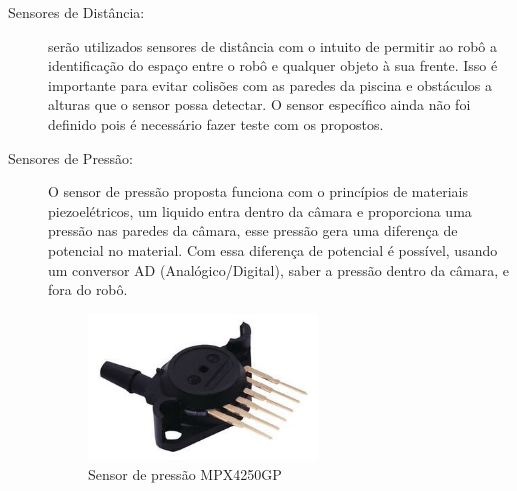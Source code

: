 \begin{description}
\item[Sensores de Distância:] serão utilizados sensores de distância com o
intuito de permitir ao robô a identificação do espaço entre o robô e qualquer
objeto à sua frente. Isso é importante para evitar colisões com as paredes da
piscina e obstáculos a alturas que o sensor possa detectar. O sensor específico
ainda não foi definido pois é necessário fazer teste com os propostos.

\item[Sensores de Pressão:] O sensor de pressão proposta funciona com o
princípios de materiais piezoelétricos, um liquido entra dentro da câmara
e proporciona uma pressão nas paredes da câmara, esse pressão gera uma
diferença de potencial no material. Com essa diferença de potencial é
possível, usando um conversor AD (Analógico/Digital), saber a pressão dentro
da câmara, e fora do robô.
\par
\begin{figure}[h]
  \centering
  \includegraphics[width=0.6\textwidth]{figures/pressure-sensor.png}
  \caption{Sensor de pressão MPX4250GP}
  \label{fig:pressure-sensor}
\end{figure}
\FloatBarrier


\end{description}
